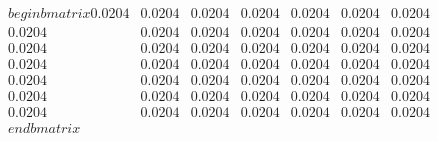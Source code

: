 \documentclass[preview]{standalone}
\begin{document}
\begin{align*}
\quad\\begin{bmatrix}0.0204 & 0.0204 & 0.0204 & 0.0204 & 0.0204 & 0.0204 & 0.0204 \quad\\ 0.0204 & 0.0204 & 0.0204 & 0.0204 & 0.0204 & 0.0204 & 0.0204 \quad\\ 0.0204 & 0.0204 & 0.0204 & 0.0204 & 0.0204 & 0.0204 & 0.0204 \quad\\ 0.0204 & 0.0204 & 0.0204 & 0.0204 & 0.0204 & 0.0204 & 0.0204 \quad\\ 0.0204 & 0.0204 & 0.0204 & 0.0204 & 0.0204 & 0.0204 & 0.0204 \quad\\ 0.0204 & 0.0204 & 0.0204 & 0.0204 & 0.0204 & 0.0204 & 0.0204 \quad\\ 0.0204 & 0.0204 & 0.0204 & 0.0204 & 0.0204 & 0.0204 & 0.0204\quad\\end{bmatrix}
\end{align*}
\end{document}

